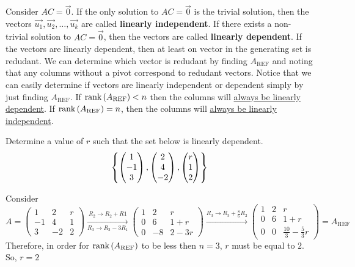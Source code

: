 Consider $AC = \vec{0}$. If the only solution to $AC=\vec{0}$ is the trivial solution, then the vectors $\vec{u_1}, \vec{u_2}, \ldots, \vec{u_k}$ are called \textbf{linearly independent}. If there exists a non-trivial solution to $AC=\vec{0}$, then the vectors are called \textbf{linearly dependent}. If the vectors are linearly dependent, then at least on vector in the generating set is redudant. We can determine which vector is redudant by finding $A_{\text{REF}}$ and noting that any columns without a pivot correspond to redudant vectors. Notice that we can easily determine if vectors are linearly independent or dependent simply by just finding $A_{\text{REF}}$. If $\text{rank}\left(A_{\text{REF}}\right) < n$ then the columns will \underline{always be linearly dependent}. If $\text{rank}\left(A_\text{REF}\right)=n$, then the columns will \underline{always be linearly independent}.

\begin{example}{}{}
    Determine a value of $r$ such that the set below is linearly dependent. 
    \[
        \left\{\begin{pmatrix}
            1 \\ -1 \\ 3
        \end{pmatrix}, 
        \begin{pmatrix}
            2 \\ 4 \\ -2
        \end{pmatrix}, 
        \begin{pmatrix}
            r \\ 1 \\ 2
        \end{pmatrix} \right\}
    \]
    \begin{solution}
        Consider 
        \[
            A = \begin{pmatrix}
                1 & 2 & r \\
                -1 & 4 & 1 \\
                3 & -2 & 2
            \end{pmatrix} 
            \xrightarrow[R_3 \to R_3 - 3R_1]{R_2 \to R_2 + R1}
            \begin{pmatrix}
                1 & 2 & r \\
                0 & 6 & 1 + r \\
                0 & -8 & 2 - 3r
            \end{pmatrix}
            \xrightarrow{R_3 \to R_3 + \frac{8}{6}R_2}
            \begin{pmatrix}
                1 & 2 & r \\
                0 & 6 & 1 + r \\
                0 & 0 & \frac{10}{3} - \frac{5}{3}r
            \end{pmatrix}
            = A_{\text{REF}}
        \]
        Therefore, in order for $\text{rank}\left(A_\text{REF}\right)$ to be less then $n=3$, $r$ must be equal to $2$. So, $\boxed{r=2}$
    \end{solution}
\end{example}

